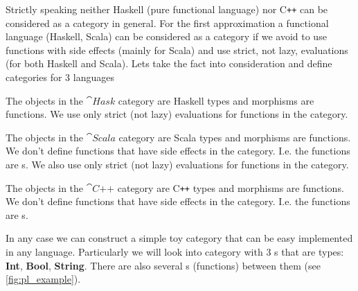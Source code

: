 Strictly speaking neither Haskell (pure functional language) nor C\texttt{++}
can be considered as a category in general. For the first approximation
a functional language (Haskell, Scala) can be considered as a
category if we avoid to use functions with side effects (mainly for
Scala) and use strict, not lazy, evaluations (for both Haskell and
Scala). Lets take the fact into consideration and define categories for 3
languages 

\begin{definition}
\label{def:haskcategory}
The objects in the $\cat{Hask}$ category are Haskell types and
morphisms are functions. We use only strict (not lazy) evaluations for
functions in the category.
\end{definition}

\begin{definition}
\label{def:scalacategory}
The objects in the $\cat{Scala}$ category are Scala types and
morphisms are functions. We don't define functions that have side effects
in the category. I.e. the functions are
s. 
We also use only strict (not lazy) evaluations for
functions in the category.
\end{definition}

\begin{definition}
\label{def:cppcategory}
The objects in the $\cat{C\texttt{++}}$ category are C\texttt{++}
types and morphisms are functions. We don't define functions that have
side effects in the category. I.e. the functions are
s.  
\end{definition}


In any case we can construct a simple toy category that can be easy
implemented in any language. Particularly we will look into category
with 3 s that are types: \textbf{Int}, \textbf{Bool},
\textbf{String}. There are also several s
(functions) between them (see \cref{fig:pl_example}).    

